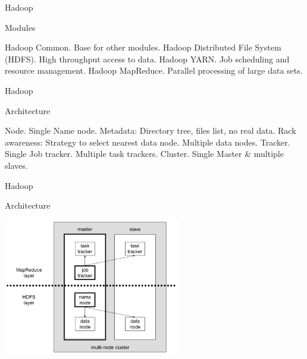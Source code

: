 \begin{frame}{Hadoop}
  \begin{block}{Modules}
    \begin{outline}
      \1 Hadoop Common.
        \2 Base for other modules. 
      \1 Hadoop Distributed File System (HDFS).
        \2 High throughput access to data.
      \1 Hadoop YARN.
        \2 Job scheduling and resource management.
      \1 Hadoop MapReduce.
        \2 Parallel processing of large data sets.
    \end{outline}
  \end{block}
\end{frame}

\begin{frame}{Hadoop}
  \begin{block}{Architecture}
    \begin{outline}
      \1 Node.
        \2 Single Name node.
          \3 Metadata: Directory tree, files list, no real data.
          \3 Rack awareness: Strategy to select nearest data node.
        \2 Multiple data nodes.
      \1 Tracker.
        \2 Single Job tracker.
        \2 Multiple task trackers.
      \1 Cluster.
        \2 Single Master \& multiple slaves.
    \end{outline}
  \end{block}
\end{frame}

\begin{frame}{Hadoop}
  \begin{block}{Architecture}
    \begin{center}
      \includegraphics[height=6cm]{img/hadoop-architecture.png}
    \end{center}
  \end{block}
\end{frame}

